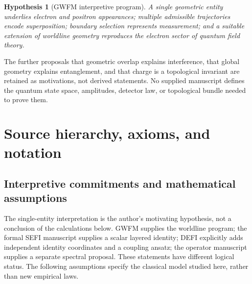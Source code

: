 \documentclass[aip,jmp,reprint,onecolumn,amsmath,amssymb]{revtex4-2}
\newtheorem{hypothesis}{Hypothesis}
\begin{document}
\begin{hypothesis}[GWFM interpretive program]
A single geometric entity underlies electron and positron appearances; multiple admissible trajectories encode superposition; boundary selection represents measurement; and a suitable extension of worldline geometry reproduces the electron sector of quantum field theory.
\end{hypothesis}
The further proposals that geometric overlap explains interference, that global geometry explains entanglement, and that charge is a topological invariant are retained as motivations, not derived statements. No supplied manuscript defines the quantum state space, amplitudes, detector law, or topological bundle needed to prove them.

\section{Source hierarchy, axioms, and notation}
\subsection{Interpretive commitments and mathematical assumptions}
The single-entity interpretation is the author's motivating hypothesis, not a conclusion of the calculations below. GWFM supplies the worldline program; the formal SEFI manuscript supplies a scalar layered identity; DEFI explicitly adds independent identity coordinates and a coupling ansatz; the operator manuscript supplies a separate spectral proposal. These statements have different logical status. The following assumptions specify the classical model studied here, rather than new empirical laws.
\end{document}
